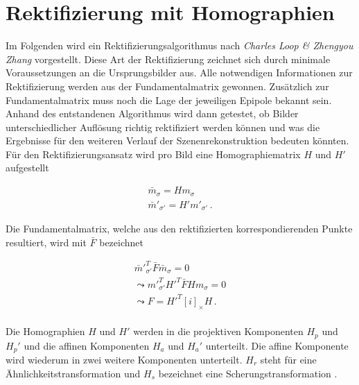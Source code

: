 \section{Rektifizierung mit Homographien}
\label{sec:Rektifizierungsalg}

Im Folgenden wird ein Rektifizierungsalgorithmus nach \textit{Charles Loop \& Zhengyou Zhang}\cite{ZZ} vorgestellt. Diese Art der Rektifizierung zeichnet sich durch minimale Voraussetzungen an die Ursprungsbilder aus. Alle notwendigen Informationen zur Rektifizierung werden aus der Fundamentalmatrix gewonnen. Zusätzlich zur Fundamentalmatrix muss noch die Lage der jeweiligen Epipole bekannt sein\cite{phdextrinsicPara}. Anhand des entstandenen Algorithmus wird dann getestet, ob Bilder unterschiedlicher Auflösung richtig rektifiziert werden können und was die Ergebnisse für den weiteren Verlauf der Szenenrekonstruktion bedeuten könnten.\\

Für den Rektifizierungsansatz wird pro Bild eine Homographiematrix $H$ und $H'$ aufgestellt


\begin{gather}
	\bar{m}_\sigma= H m_\sigma\\ \label{eq:rectifyPoints}
	\bar{m}'_{\sigma'}= H'm'_{\sigma'}\, .
\end{gather}


Die Fundamentalmatrix, welche aus den rektifizierten korrespondierenden Punkte resultiert, wird mit $\bar{F}$ bezeichnet\cite{ZZ,phdextrinsicPara}


\begin{gather}
	\bar{m}'^T_{\sigma'}\bar{F}\bar{m}_\sigma = 0\\
	\leadsto m'^T_{\sigma'}H'^T\bar{F}Hm_\sigma=0\\	
	\leadsto F = H'^T[i]_\times H	\, .
\end{gather}\\


Die Homographien $H$ und $H'$ werden in die projektiven Komponenten $H_p$ und $H_p'$ und die affinen Komponenten $H_a$ und $H_a'$ unterteilt. Die affine Komponente wird wiederum in zwei weitere Komponenten unterteilt. $H_r$ steht für eine Ähnlichkeitstransformation und $H_s$ bezeichnet eine Scherungstransformation \cite{ZZ,phdextrinsicPara}.


